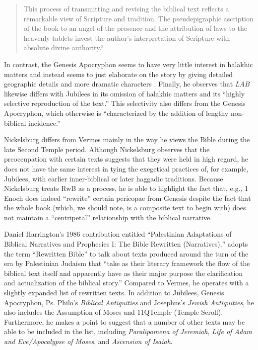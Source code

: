 \begin{quote}
This process of transmitting and revising the biblical text reflects a
remarkable view of Scripture and tradition. The pseudepigraphic
ascription of the book to an angel of the presence and the attribution
of laws to the heavenly tablets invest the author's interpretation of
Scripture with absolute divine
authority.``\autocite[101]{nickelsburg_stone1984}
\end{quote}

In contrast, the Genesis Apocryphon seems to have very little interest
in halakhic matters and instead seems to just elaborate on the story by
giving detailed geographic details and more dramatic characters
\autocite[106]{nickelsburg_stone1984}. Finally, he observes that
\emph{LAB} likewise differs with Jubilees in its omission of halakhic
matters and its ``highly selective reproduction of the
text.''\autocite[110]{nickelsburg_stone1984} This selectivity also
differs from the Genesis Apocryphon, which otherwise is ``characterized
by the addition of lengthy non-biblical
incidence.''\autocite[110]{nickelsburg_stone1984}

Nickelsburg differs from Vermes mainly in the way he views the Bible
during the late Second Temple period. Although Nickelsburg observes that
the preoccupation with certain texts suggests that they were held in
high regard, he does not have the same interest in tying the exegetical
practices of, for example, Jubilees, with earlier inner-biblical or
later haggadic traditions. Because Nickelsburg treats RwB as a process,
he is able to highlight the fact that, e.g., 1 Enoch does indeed
``rewrite'' certain pericopae from Genesis despite the fact that the
whole book (which, we should note, is a composite text to begin with)
does not maintain a ``centripetal'' relationship with the biblical
narrative.

Daniel Harrington's 1986 contribution entitled ``Palestinian Adaptations
of Biblical Narratives and Prophecies I: The Bible Rewritten
(Narratives),'' adopts the term ``Rewritten Bible'' to talk about texts
produced around the turn of the era by Palestinian Judaism that ``take
as their literary framework the flow of the biblical text itself and
apparently have as their major purpose the clarification and
actualization of the biblical
story.''\autocite[239]{harrington_kraft-nickelsburg1986} Compared to
Vermes, he operates with a slightly expanded list of rewritten texts. In
addition to Jubilees, Genesis Apocryphon, Ps. Philo's \emph{Biblical
Antiquities} and Josephus's \emph{Jewish Antiquities}, he also includes
the Assumption of Moses and 11QTemple (Temple Scroll). Furthermore, he
makes a point to suggest that a number of other texts may be able to be
included in the list, including \emph{Paralipomena of Jeremiah},
\emph{Life of Adam and Eve/Apocalypse of Moses}, and \emph{Ascension of
Isaiah}.

